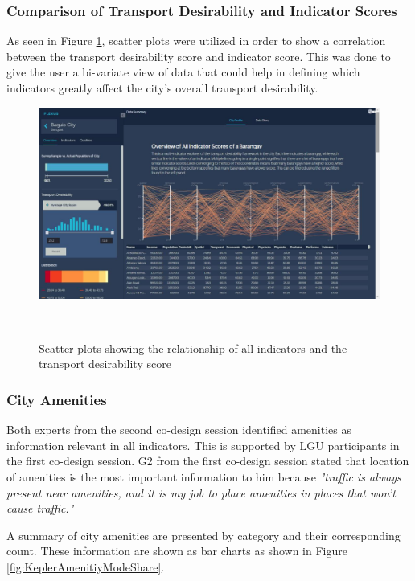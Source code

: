 \documentclass{sigchi}
\begin{document}
\subsubsection{Comparison of Transport Desirability and Indicator Scores}
As seen in Figure \ref{fig:KeplerScatterPlot}, scatter plots were utilized in order to show a correlation between the transport desirability score and indicator score. This was done to give the user a bi-variate view of data that could help in defining which indicators greatly affect the city's overall transport desirability.

\begin{figure}
\centering
  \includegraphics[width=0.9\columnwidth]{figures/latest-screens/pcords.jpg}
  \caption{Scatter plots showing the relationship of all indicators and the transport desirability score}~\label{fig:KeplerScatterPlot}
\end{figure}

\subsubsection{City Amenities}
Both experts from the second co-design session identified amenities as information relevant in all indicators. This is supported by LGU participants in the first co-design session. G2 from the first co-design session stated that location of amenities is the most important information to him because \textit{"traffic is always present near amenities, and it is my job to place amenities in places that won't cause traffic."} 


A summary of city amenities are presented by category and their corresponding count. These information are shown as bar charts as shown in Figure \ref{fig:KeplerAmenitiyModeShare}.
\end{document}
